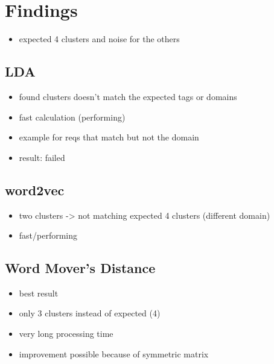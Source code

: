 \section{Findings} %
\label{sec:findings}

\begin{itemize}
\item expected 4 clusters and noise for the others
\end{itemize}

\subsection{LDA} %
\label{sub:findings_lda}

\begin{itemize}
\item found clusters doesn't match the expected tags or domains
\item fast calculation (performing)
\item example for reqs that match but not the domain
\item result: failed
\end{itemize}

\subsection{word2vec} %
\label{sub:findings_w2v}

\begin{itemize}
\item two clusters -> not matching expected 4 clusters (different domain)
\item fast/performing
\end{itemize}


\subsection{Word Mover's Distance} %
\label{sub:findings_wmd}

\begin{itemize}
\item best result
\item only 3 clusters instead of expected (4)
\item very long processing time
\item improvement possible because of symmetric matrix
\end{itemize}

